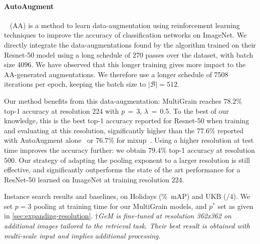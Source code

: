 \paragraph{AutoAugment}~\cite{cubuk2018autoaugment} (AA) is a method to learn data-augmentation  
%
%
%
%
using reinforcement learning techniques to improve the accuracy of classification networks on ImageNet. 
We %
directly integrate the data-augmentations found by the algorithm 
\cite{cubuk2018autoaugment} trained on their Resnet-50 model using a long schedule of 270 passes over the dataset, with batch size $4096$. 
We have observed that this longer training gives more impact to the AA-generated augmentations. 
We therefore use a longer schedule of 7508 iterations per epoch, keeping the batch size to $|\mathcal{B}|=512$. 

Our method benefits from this data-augmentation: 
MultiGrain reaches $78.2\%$ top-1 accuracy at resolution $224$ with $p$\,$=$\,3, $\lambda$\,$=$\,0.5.
To the best of our knowledge, this is the best top-1 accuracy reported for Resnet-50 when training and evaluating at this resolution, significantly higher than the $77.6\%$ reported with AutoAugment alone~\cite{cubuk2018autoaugment} or $76.7\%$ for mixup~\cite{zhang2018mixup}.
Using a higher resolution at test time improves the accuracy further: we obtain $79.4\%$ top-1 accuracy at resolution $500$. 
Our strategy of adapting the pooling exponent to a larger resolution is still effective, and significantly outperforms the state of the art performance for a ResNet-50 learned on ImageNet at training resolution $224$. %



%
%
%
%
%
%

%
%
%
%
%
%


%
%

%
%

\begin{table}
\centering
\caption{\label{tab:instanceres}
	Instance search results and baselines, on Holidays ($\%$~mAP) and UKB ($/4$).
	We set $p=3$ pooling at training time for our MultiGrain models, and $p^*$ set as given in \cref{sec:expanding-resolution}. 
	$\dagger${\small \em GeM is fine-tuned at resolution 362x362 on additional images tailored to the retrieval task. Their best result is obtained with multi-scale input and implies additional processing.
}}
\vspace{-2pt}

\vspace{-5pt}
\end{table}

